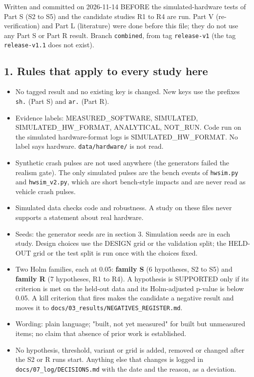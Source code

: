 


Written and committed on 2026-11-14 BEFORE the simulated-hardware tests of Part S (S2 to S5) and the candidate studies R1 to R4 are run. Part V (re-verification) and Part L (literature) were done before this file; they do not use any Part S or Part R result. Branch \texttt{combined}, from tag \texttt{release-v1} (the tag \texttt{release-v1.1} does not exist).

\subsection*{1. Rules that apply to every study here}

\begin{itemize}
\item No tagged result and no existing key is changed. New keys use the prefixes \texttt{sh.} (Part S) and \texttt{ar.} (Part R).
\item Evidence labels: MEASURED\_SOFTWARE, SIMULATED, SIMULATED\_HW\_FORMAT, ANALYTICAL, NOT\_RUN. Code run on the simulated hardware-format logs is SIMULATED\_HW\_FORMAT. No label says hardware. \texttt{data/hardware/} is not read.
\item Synthetic crash pulses are not used anywhere (the generators failed the realism gate). The only simulated pulses are the bench events of \texttt{hwsim.py} and \texttt{hwsim\_v2.py}, which are short bench-style impacts and are never read as vehicle crash pulses.
\item Simulated data checks code and robustness. A study on these files never supports a statement about real hardware.
\item Seeds: the generator seeds are in section 3. Simulation seeds are in each study. Design choices use the DESIGN grid or the validation split; the HELD-OUT grid or the test split is run once with the choices fixed.
\item Two Holm families, each at 0.05: \textbf{family S} (6 hypotheses, S2 to S5) and \textbf{family R} (7 hypotheses, R1 to R4). A hypothesis is SUPPORTED only if its criterion is met on the held-out data and its Holm-adjusted p-value is below 0.05. A kill criterion that fires makes the candidate a negative result and moves it to \texttt{docs/03\_results/NEGATIVES\_REGISTER.md}.
\item Wording: plain language; "built, not yet measured" for built but unmeasured items; no claim that absence of prior work is established.
\item No hypothesis, threshold, variant or grid is added, removed or changed after the S2 or R runs start. Anything else that changes is logged in \texttt{docs/07\_log/DECISIONS.md} with the date and the reason, as a deviation.
\end{itemize}

